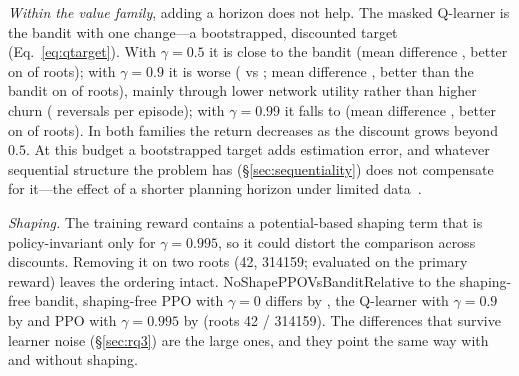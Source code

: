 \emph{Within the value family}, adding a horizon does not help. The masked
Q-learner is the bandit with one change---a bootstrapped, discounted target
(Eq.~\ref{eq:qtarget}). With $\gamma=0.5$ it is close to the
bandit (mean difference \HQPointFiveVs, better on \HQPointFiveRootsBetter{} of
\HQPointFiveRoots{} roots); with $\gamma=0.9$ it is worse (\HQPointNine{} vs
\HQZero; mean difference \HQPointNineVs, better than the bandit on
\HQPointNineRootsBetter{} of \HQPointNineRoots{} roots), mainly through lower
network utility rather than higher churn (\HQPointNineRev{} reversals per
episode); with $\gamma=0.99$ it falls to \HQPointNineNine{} (mean difference
\HQPointNineNineVs, better on \HQPointNineNineRootsBetter{} of
\HQPointNineNineRoots{} roots). In both families the return decreases as the
discount grows beyond $0.5$. At this budget a bootstrapped target adds estimation error, and whatever
sequential structure the problem has (\S\ref{sec:sequentiality}) does not
compensate for it---the effect of a shorter planning horizon under limited
data~\citep{jiang2015horizon,amit2020discount}.

\emph{Shaping.} The training reward contains a potential-based shaping term
that is policy-invariant only for $\gamma=0.995$, so it could distort the
comparison across discounts. Removing it on two roots (42, 314159; evaluated
on the primary reward) leaves the ordering intact.
\ifcsname NoShapePPOVsBandit\endcsname Relative to the shaping-free bandit,
shaping-free PPO with $\gamma=0$ differs by \NoShapePPOZeroVsBanditPerRoot{},
the Q-learner with $\gamma=0.9$ by \NoShapeQVsBanditPerRoot{} and PPO with
$\gamma=0.995$ by \NoShapePPOVsBanditPerRoot{} (roots 42 / 314159). The
differences that survive learner noise (\S\ref{sec:rq3}) are the large ones,
and they point the same way with and without shaping.\fi
